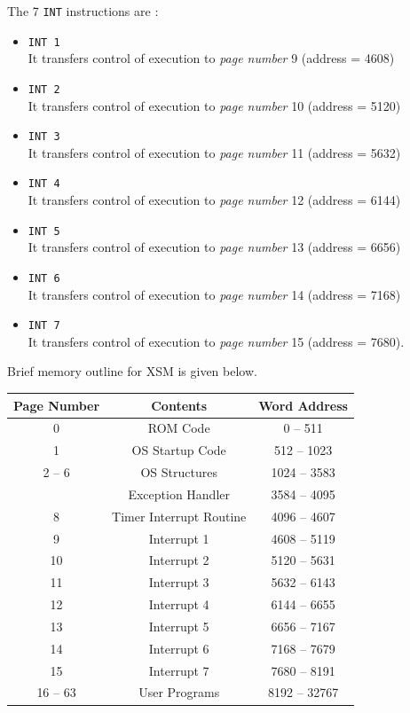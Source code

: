 \documentclass[11pt]{report}
\begin{document}
The 7 \texttt{INT} instructions are :
\begin{itemize}

\item \texttt{INT 1}  \\It transfers control of execution to \textit{page number} 9 (address = 4608)
\item \texttt{INT 2}  \\It transfers control of execution to \textit{page number} 10 (address = 5120)  
\item \texttt{INT 3}  \\It transfers control of execution to \textit{page number} 11 (address = 5632)
\item \texttt{INT 4}  \\It transfers control of execution to \textit{page number}  12 (address = 6144) 
\item \texttt{INT 5}  \\It transfers control of execution to \textit{page number} 13 (address = 6656)
\item \texttt{INT 6}  \\It transfers control of execution to \textit{page number} 14 (address = 7168)
\item \texttt{INT 7}  \\It transfers control of execution to \textit{page number} 15 (address = 7680).\
 
\end{itemize}

Brief memory outline for XSM is given below.
\begin{center}
\begin{tabular}{|c|c|c|}
\hline \textbf{Page Number} & \textbf{Contents} & \textbf{Word Address}  \\ 
\hline 0 & ROM Code &  0 -- 511\\ 
1 & OS Startup Code & 512 -- 1023 \\ 
2 -- 6 & OS Structures  &  1024 -- 3583\\ 
 \rowcolor{gray!15}
\hline 7 & Exception Handler  &  3584 -- 4095\\ 
 \rowcolor{gray!15}
 8 & Timer Interrupt Routine  &  4096 -- 4607\\ 
 \rowcolor{gray!15}
 9 & Interrupt 1  &  4608 -- 5119\\ 
 \rowcolor{gray!15}
10 & Interrupt 2  &  5120 -- 5631\\ 
 \rowcolor{gray!15}
 11 & Interrupt 3  &  5632 -- 6143\\ 
 \rowcolor{gray!15}
 12 & Interrupt 4  &  6144 -- 6655\\ 
 \rowcolor{gray!15}
 13 & Interrupt 5  &  6656 -- 7167\\ 
 \rowcolor{gray!15}
 14 & Interrupt 6  &  7168 -- 7679\\
 \rowcolor{gray!15} 
 15 & Interrupt 7  &  7680 -- 8191\\ 
\hline 16 -- 63 & User Programs & 8192 -- 32767\\
\hline
\end{tabular} 
\end{center}
\end{document}
